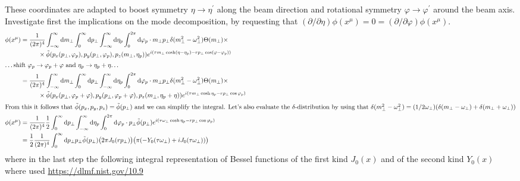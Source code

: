 These coordinates are adapted to boost symmetry $\eta\to\eta^\prime$ along the beam direction and rotational symmetry $\varphi\to\varphi^\prime$ around the beam axis. Investigate first the implications on the mode decomposition, by requesting that $(\partial/\partial\eta)\phi(x^\mu)=0=(\partial/\partial\varphi)\phi(x^\mu)$.
\begin{subequations}
    \begin{align}
        \phi(x^\mu) & =\frac{1}{(2\pi)^4}\int_{-\infty}^\infty\text{d} m_\perp\int_0^\infty\text{d} p_\perp\int_{-\infty}^\infty\text{d}\eta_p\int_0^{2\pi}\text{d}\varphi_p\cdot m_\perp p_\perp\delta(m_\perp^2-\omega_\perp^2)\Theta(m_\perp)\times\nonumber \\
                    & \phantom{=}\qquad\times \tilde{\phi}(p_x(p_\perp,\varphi_p),p_y(p_\perp,\varphi_p),p_z(m_\perp,\eta_p))e^{{i}(\tau m_\perp\cosh(\eta-\eta_p)-r p_\perp\cos(\varphi-\varphi_p))}                                    \\
        \intertext{\dots shift $\varphi_p\to\varphi_p+\varphi$ and $\eta_p\to\eta_p+\eta$\dots}
                    & =\frac{1}{(2\pi)^4}\int_{-\infty}^\infty\text{d} m_\perp\int_0^\infty\text{d} p_\perp\int_{-\infty}^\infty\text{d}\eta_p\int_0^{2\pi}\text{d}\varphi_p\cdot m_\perp p_\perp\delta(m_\perp^2-\omega_\perp^2)\Theta(m_\perp)\times\nonumber \\
                    & \phantom{=}\qquad\times \tilde{\phi}(p_x(p_\perp,\varphi_p+\varphi),p_y(p_\perp,\varphi_p+\varphi),p_z(m_\perp,\eta_p+\eta))e^{{i}(\tau m_\perp\cosh\eta_p-r p_\perp\cos\varphi_p)}                                \\
        \intertext{From this it follows that $\tilde{\phi}(p_x,p_y,p_z)=\tilde{\phi}(p_\perp)$ and we can simplify the integral. Let's also evaluate the $\delta$-distribution by using that $\delta(m_\perp^2-\omega_\perp^2)=(1/2\omega_\perp)(\delta(m_\perp-\omega_\perp)+\delta(m_\perp+\omega_\perp))$}
        \phi(x^\mu) & =\frac{1}{(2\pi)^4}\frac{1}{2}\int_0^\infty\text{d} p_\perp\int_{-\infty}^\infty\text{d}\eta_p\int_0^{2\pi}\text{d}\varphi_p\cdot p_\perp\tilde{\phi}(p_\perp)e^{{i}(\tau \omega_\perp\cosh\eta_p-r p_\perp\cos\varphi_p)}        \\
                    & =\frac{1}{2}\frac{1}{(2\pi)^4}\int_0^\infty\text{d} p_\perp p_\perp\tilde{\phi}(p_\perp)\big(2\pi J_0(r p_\perp)\big)\big(\pi(-Y_0(\tau\omega_\perp)+{i} J_0(\tau\omega_\perp))\big)
    \end{align}
\end{subequations}
where in the last step the following integral representation of Bessel functions of the first kind $J_0(x)$ and of the second kind $Y_0(x)$ where used \url{https://dlmf.nist.gov/10.9}
